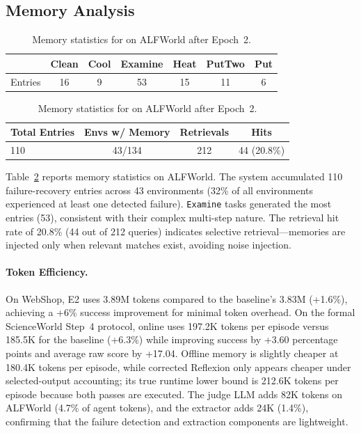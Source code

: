 \subsection{Memory Analysis}
\label{sec:memory_analysis}

\begin{table}[t]
\centering
\caption{Memory statistics for \method{} on ALFWorld after Epoch~2.}
\label{tab:memory_stats}
\begin{tabular}{lcccccc}
\toprule
 & Clean & Cool & Examine & Heat & PutTwo & Put \\
\midrule
Entries & 16 & 9 & 53 & 15 & 11 & 6 \\
\bottomrule
\end{tabular}
\vspace{0.5em}

\begin{tabular}{lccc}
\toprule
Total Entries & Envs w/ Memory & Retrievals & Hits \\
\midrule
110 & 43/134 & 212 & 44 (20.8\%) \\
\bottomrule
\end{tabular}
\end{table}

Table~\ref{tab:memory_stats} reports memory statistics on ALFWorld. The system accumulated 110 failure-recovery entries across 43 environments (32\% of all environments experienced at least one detected failure). \texttt{Examine} tasks generated the most entries (53), consistent with their complex multi-step nature. The retrieval hit rate of 20.8\% (44 out of 212 queries) indicates selective retrieval---memories are injected only when relevant matches exist, avoiding noise injection.

\paragraph{Token Efficiency.} On WebShop, \method{} E2 uses 3.89M tokens compared to the baseline's 3.83M (+1.6\%), achieving a +6\% success improvement for minimal token overhead. On the formal ScienceWorld Step~4 protocol, online \method{} uses 197.2K tokens per episode versus 185.5K for the baseline (+6.3\%) while improving success by +3.60 percentage points and average raw score by +17.04. Offline memory is slightly cheaper at 180.4K tokens per episode, while corrected Reflexion only appears cheaper under selected-output accounting; its true runtime lower bound is 212.6K tokens per episode because both passes are executed. The judge LLM adds 82K tokens on ALFWorld (4.7\% of agent tokens), and the extractor adds 24K (1.4\%), confirming that the failure detection and extraction components are lightweight.

